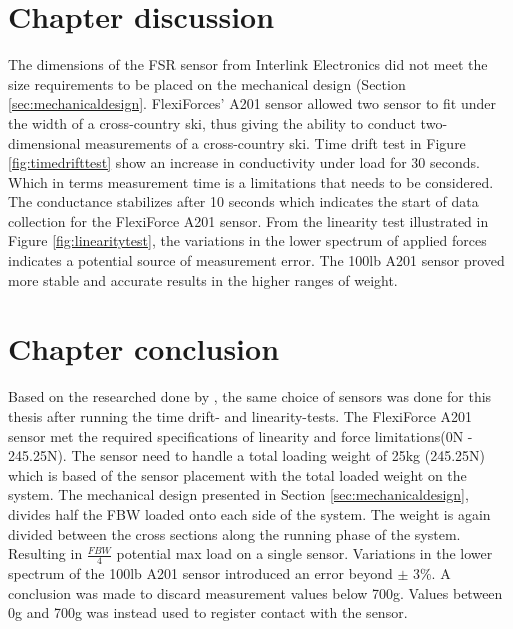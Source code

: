 \section{Chapter discussion}
The dimensions of the FSR sensor from Interlink Electronics did not meet the size requirements to be placed on the mechanical design (Section \ref{sec:mechanicaldesign}. FlexiForces' A201 sensor allowed two sensor to fit under the width of a cross-country ski, thus giving the ability to conduct two-dimensional measurements of a cross-country ski. Time drift test in Figure \ref{fig:timedrifttest} show an increase in conductivity under load for 30 seconds. Which in terms measurement time is a limitations that needs to be considered. The conductance stabilizes after 10 seconds which indicates the start of data collection for the FlexiForce A201 sensor. From the linearity test illustrated in Figure \ref{fig:linearitytest}, the variations in the lower spectrum of applied forces indicates a potential source of measurement error. The 100lb A201 sensor proved more stable and accurate results in the higher ranges of weight.

\section{Chapter conclusion}
Based on the researched done by \cite{vecchi_experimental_2000}, the same choice of sensors was done for this thesis after running the time drift- and linearity-tests. The FlexiForce A201 sensor met the required specifications of linearity and force limitations(0N - 245.25N). The sensor need to handle a total loading weight of 25kg (245.25N) which is based of the sensor placement with the total loaded weight on the system. The mechanical design presented in Section \ref{sec:mechanicaldesign}, divides half the FBW loaded onto each side of the system. The weight is again divided between the cross sections along the running phase of the system. Resulting in $\frac{FBW}{4}$ potential max load on a single sensor. Variations in the lower spectrum of the 100lb A201 sensor introduced an error beyond $\pm$ 3\%. A conclusion was made to discard measurement values below 700g. Values between 0g and 700g was instead used to register contact with the sensor.